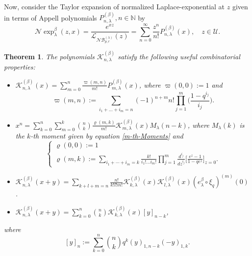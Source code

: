 \documentclass{birkjour}
\newtheorem{thm}{Theorem}[section]
\theoremstyle{definition}
\theoremstyle{remark}
\numberwithin{equation}{section}
\begin{document}
Now, consider the Taylor expansion of normalized Laplace-exponential
at $z$ given in terms of Appell polynomials $P^{(\beta)}_{n,
\lambda}, n \in \mathbb{N}$ by
\begin{equation}\label{Exp-alpha-1}
\mathcal{N}\!\exp^{\beta}_{\lambda}(z,
x)=\displaystyle{\frac{e^{xz}}{\mathcal{L}_{\mathcal{N}\mathcal{B}^{(\lambda)}_{p,
r}}(z)}= \sum^{\infty}_{n=0}\frac{z^{n}}{n!}P^{(\beta)}_{n,
\lambda}(x)},\quad z\in \mathcal{U}.
\end{equation}
\begin{thm}
The polynomials $\mathcal{K}^{(\beta)}_{n, \lambda}$ satisfy the
following useful combinatorial properties:
\begin{itemize}
\item [\textbf{(P1)}]
$\mathcal{K}^{(\beta)}_{n, \lambda}(x)=\displaystyle{\sum^{n}_{m=0}
\frac{\varpi(m, n)}{m!}P^{(\beta)}_{m, \lambda}(x)}$, where
$\varpi(0, 0):=1$ and
\begin{equation}\label{def-lambda-mn}
\varpi(m,
n):=\displaystyle{\sum_{i_{1}+\ldots+i_{m}=n}(-1)^{n+m}n!\prod^{m}_{j=1}\Big(\frac{1-q^{i_{j}}}{i_{j}}\Big)}.
\end{equation}
\item [\textbf{(P2)}]
$x^{n}=\displaystyle{\sum^{n}_{k=0}\sum^{k}_{m=0}\binom{n}{k}
\frac{\varrho(m, k)}{m!}\mathcal{K}^{(\beta)}_{m,
\lambda}(x)M_{\lambda}(n-k)}$, where $M_{\lambda}(k)$ is the $k$-th
moment given by equation \eqref{m-th-Moments} and
$$\begin{cases}
\varrho(0, 0):=1\\
\varrho(m,
k):=\displaystyle{\sum_{i_{1}+\cdots+i_{m}=k}\frac{k!}{i_{1}!\ldots
i_{m}!}\prod^{m}_{j=1}\frac{d^{i_{j}}}{dz^{i_{j}}}\Big[\frac{e^{z}-1}{1-qe^{z}}\Big]_{z=0}
}.
\end{cases}
$$
\item [\textbf{(P3)}]
$\mathcal{K}^{(\beta)}_{n,
\lambda}(x+y)=\displaystyle{\sum_{k+l+m=n}
\frac{n!}{k!l!m!}\mathcal{K}^{(\beta)}_{k,
\lambda}(x)\mathcal{K}^{(\beta)}_{l,
\lambda}(x)(e^{\beta}_{\lambda}\circ \xi_{q})^{(m)}(0)}$.
\item [\textbf{(P4)}]
$\mathcal{K}^{(\beta)}_{n,
\lambda}(x+y)=\displaystyle{\sum^{n}_{k=0}\binom{n}{k}\mathcal{K}^{(\beta)}_{k,
\lambda}(x)[y]_{n-k}}$,
\end{itemize}
where
\begin{equation}\label{def-of-[y]m}
[y]_{n}:=\displaystyle{\sum^{n}_{k=0}\binom{n}{k}q^{k}(y)_{1,
n-k}(-y)_{1, k}}.
\end{equation}
\end{thm}
\end{document}
